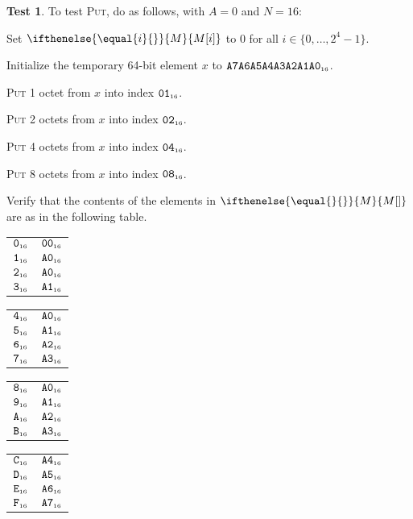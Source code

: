 \documentclass[a4paper,12pt]{article}
\makeatletter
\newcommand{\num}[1]{\texttt{#1}}
\newcommand{\hex}[1]{\num{#1}_{\textup{\tiny 16}}}
\newcommand{\MEM}[1]{\ifthenelse{\equal{#1}{}}{M}{M[#1]}}
\newcommand{\range}[2]{\{#1,\ldots,#2\}}
\newcommand{\proc}[1]{\textsc{#1}}
\theoremstyle{definition}
\newtheorem{test}{Test}
\newenvironment{memtable}{%
  \begin{trivlist}
    \item
    }{%
    \end{trivlist}}
\newenvironment{memcolumn}{%
  \begin{tabular}{@{}ll@{}}
    \hline}
    {%
    \hline
  \end{tabular}}
\newcommand{\memspace}{\qquad}
\makeatother
\begin{document}
\begin{test}
  To test \proc{Put}, do as follows, with $A=0$ and $N=16$:
  \begin{stepnumbers}
  \item Set $\MEM{i}$ to 0 for all $i \in \range{0}{2^4-1}$.
  \item Initialize the temporary 64-bit element $x$ to $\hex{A7A6A5A4A3A2A1A0}$.
  \item \proc{Put} 1 octet  from $x$ into index $\hex{01}$.
  \item \proc{Put} 2 octets from $x$ into index $\hex{02}$.
  \item \proc{Put} 4 octets from $x$ into index $\hex{04}$.
  \item \proc{Put} 8 octets from $x$ into index $\hex{08}$.
  \item Verify that the contents of the elements in $\MEM{}$ are as in the following table.
  \end{stepnumbers}

  \begin{memtable}
    \begin{memcolumn}
      $\hex{0}$ & $\hex{00}$ \\
      $\hex{1}$ & $\hex{A0}$ \\
      $\hex{2}$ & $\hex{A0}$ \\
      $\hex{3}$ & $\hex{A1}$ \\
    \end{memcolumn}
    \memspace
    \begin{memcolumn}
      $\hex{4}$ & $\hex{A0}$ \\
      $\hex{5}$ & $\hex{A1}$ \\
      $\hex{6}$ & $\hex{A2}$ \\
      $\hex{7}$ & $\hex{A3}$ \\
    \end{memcolumn}
    \memspace
    \begin{memcolumn}
      $\hex{8}$ & $\hex{A0}$ \\
      $\hex{9}$ & $\hex{A1}$ \\
      $\hex{A}$ & $\hex{A2}$ \\
      $\hex{B}$ & $\hex{A3}$ \\
    \end{memcolumn}
    \memspace
    \begin{memcolumn}
      $\hex{C}$ & $\hex{A4}$ \\
      $\hex{D}$ & $\hex{A5}$ \\
      $\hex{E}$ & $\hex{A6}$ \\
      $\hex{F}$ & $\hex{A7}$ \\
    \end{memcolumn}
  \end{memtable}
\end{test}
\end{document}
